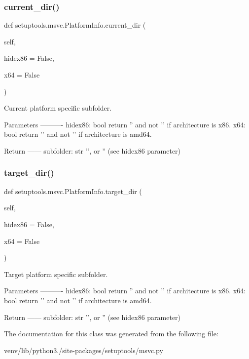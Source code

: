 \subsubsection{\texorpdfstring{current\+\_\+dir()}{current\_dir()}}
{\footnotesize\ttfamily def setuptools.\+msvc.\+Platform\+Info.\+current\+\_\+dir (\begin{DoxyParamCaption}\item[{}]{self,  }\item[{}]{hidex86 = {\ttfamily False},  }\item[{}]{x64 = {\ttfamily False} }\end{DoxyParamCaption})}

\begin{DoxyVerb}Current platform specific subfolder.

Parameters
----------
hidex86: bool
    return '' and not '' if architecture is x86.
x64: bool
    return '' and not '' if architecture is amd64.

Return
------
subfolder: str
    '\target', or '' (see hidex86 parameter)
\end{DoxyVerb}
 \mbox{\label{classsetuptools_1_1msvc_1_1_platform_info_a8ff098933fbab72ab767191b392e486b}} 
\subsubsection{\texorpdfstring{target\+\_\+dir()}{target\_dir()}}
{\footnotesize\ttfamily def setuptools.\+msvc.\+Platform\+Info.\+target\+\_\+dir (\begin{DoxyParamCaption}\item[{}]{self,  }\item[{}]{hidex86 = {\ttfamily False},  }\item[{}]{x64 = {\ttfamily False} }\end{DoxyParamCaption})}

\begin{DoxyVerb}Target platform specific subfolder.

Parameters
----------
hidex86: bool
    return '' and not '' if architecture is x86.
x64: bool
    return '' and not '' if architecture is amd64.

Return
------
subfolder: str
    '\current', or '' (see hidex86 parameter)
\end{DoxyVerb}
 

The documentation for this class was generated from the following file\+:\begin{DoxyCompactItemize}
\item 
venv/lib/python3./site-\/packages/setuptools/msvc.\+py\end{DoxyCompactItemize}
